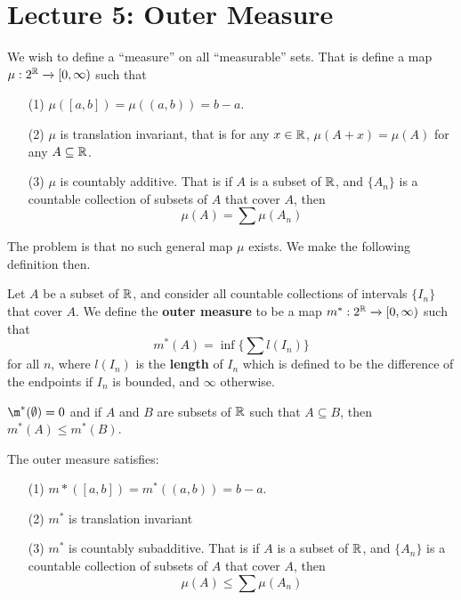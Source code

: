 \section*{Lecture 5: Outer Measure}

We wish to define a ``measure'' on all ``measurable'' sets. That is define a map
$\mu:2^{\mathbb{R}} \xrightarrow{} [0,\infty)$ such that
\begin{enumerate}
    \item[(1)] $\mu([a,b])=\mu((a,b))=b-a$.

    \item[(2)] $\mu$ is translation invariant, that is for any  $x \in \mathbb{R}$,
        $\mu(A+x)=\mu(A)$ for any $A \subseteq \mathbb{R}$.

    \item[(3)] $\mu$ is countably additive. That is if  $A$ is a subset of
        $\mathbb{R}$, and $\{A_n\}$ is a countable collection of subsets of $A$ that
        cover $A$, then
        \begin{equation*}
            \mu(A)=\sum{\mu(A_n)}
        \end{equation*}
\end{enumerate}

The problem is that no such general map $\mu$ exists. We make the following
definition then.

\begin{definition}
    Let $A$ be a subset of  $\mathbb{R}$, and consider all countable collections of
    intervals $\{I_n\}$ that cover $A$. We define the  \textbf{outer measure} to
    be a map $m^*:2^{\mathbb{R}} \xrightarrow{} [0,\infty)$ such that
    \begin{equation}
        m^*(A)=\inf{\{\sum{l(I_n)}\}}
    \end{equation}
    for all $n$, where $l(I_n)$ is the \textbf{length} of $I_n$ which is defined
    to be the difference of the endpoints if $I_n$ is bounded, and $\infty$
    otherwise.
\end{definition}

\begin{lemma}\label{lemma_4.37}
    $\m^*(\emptyset)=0$ and if $A$ and  $B$ are subsets of  $\mathbb{R}$ such that  $A
    \subseteq B$, then  $m^*(A) \leq m^*(B)$.
\end{lemma}

\begin{theorem}\label{thm_4.38}
    The outer measure satisfies:
    \begin{enumerate}
        \item[(1)] $m*([a,b])=m^*((a,b))=b-a$.

        \item[(2)] $m^*$ is translation invariant

        \item[(3)] $m^*$ is countably subadditive. That is  if  $A$ is a subset
            of $\mathbb{R}$, and $\{A_n\}$ is a countable collection of subsets of $A$
            that cover $A$, then
            \begin{equation*}
                \mu(A) \leq \sum{\mu(A_n)}
            \end{equation*}
    \end{enumerate}
\end{theorem}

